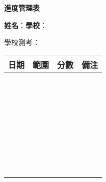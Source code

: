\documentclass{article}
\begin{document}
    \begin{center}
        \textbf{進度管理表}
    \end{center}

    \noindent\textbf{姓名}：\hrulefill\hfill\textbf{學校}：\hrulefill

    \noindent 學校測考：

    \begin{center}
        \begin{tabular}{|m{2cm}|m{6cm}|m{2cm}|m{5cm}|}
            \hline
            日期&範圍&分數&備注\\
            \hline
            &&&\\ &&&\\
            \hline
            &&&\\ &&&\\
            \hline
            &&&\\ &&&\\
            \hline
            &&&\\ &&&\\
            \hline
            &&&\\ &&&\\
            \hline
            &&&\\ &&&\\
            \hline
            &&&\\ &&&\\
            \hline
            &&&\\ &&&\\
            \hline
            &&&\\ &&&\\
            \hline
            &&&\\ &&&\\
            \hline
            &&&\\ &&&\\
            \hline
            &&&\\ &&&\\
            \hline
            &&&\\ &&&\\
            \hline
            &&&\\ &&&\\
            \hline
            &&&\\ &&&\\
            \hline
            &&&\\ &&&\\
            \hline
            &&&\\ &&&\\
            \hline
        \end{tabular}
    \end{center}
\end{document}
